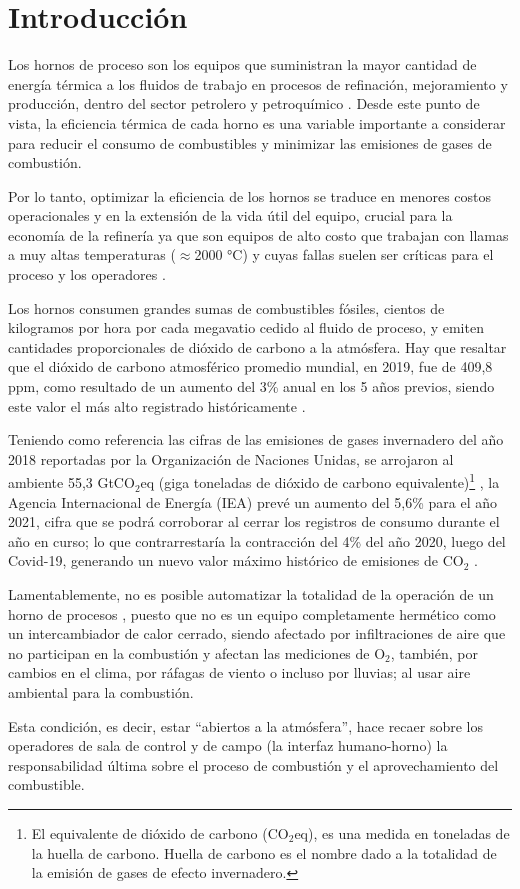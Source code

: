 \chapter*{Introducción}

\par Los hornos de proceso son los equipos que suministran la mayor cantidad de energía térmica a los fluidos de trabajo en procesos de refinación, mejoramiento y producción, dentro del sector petrolero y petroquímico \cite{bib:sandoval}. Desde este punto de vista, la eficiencia térmica de cada horno es una variable importante a considerar para reducir el consumo de combustibles y minimizar las emisiones de gases de combustión.

\par Por lo tanto, optimizar la eficiencia de los hornos se traduce en menores costos operacionales y en la extensión de la vida útil del equipo, crucial para la economía de la refinería ya que son equipos de alto costo que trabajan con llamas a muy altas temperaturas ($\approx$2000 °C) y cuyas fallas suelen ser críticas para el proceso y los operadores \cite{bib:economics}.

\par Los hornos consumen grandes sumas de combustibles fósiles, cientos de kilogramos por hora por cada megavatio cedido al fluido de proceso, y emiten cantidades proporcionales de dióxido de carbono a la atmósfera. Hay que resaltar que el dióxido de carbono atmosférico promedio mundial, en 2019, fue de 409,8 ppm, como resultado de un aumento del 3\% anual en los 5 años previos, siendo este valor el más alto registrado históricamente \cite{bib:clima}.
\par Teniendo como referencia las cifras de las emisiones de gases invernadero del año 2018 reportadas por la Organización de Naciones Unidas, se arrojaron al ambiente 55,3 GtCO$_2$eq (giga toneladas de dióxido de carbono equivalente)\footnote{El equivalente de dióxido de carbono (CO$_2$eq), es una medida en toneladas de la huella de carbono. Huella de carbono es el nombre dado a la totalidad de la emisión de gases de efecto invernadero.} \cite{onu}, la Agencia Internacional de Energía (IEA) prevé un aumento del 5,6\% para el año 2021, cifra que se podrá corroborar al cerrar los registros de consumo durante el año en curso; lo que contrarrestaría la contracción del 4\% del año 2020, luego del Covid-19, generando un nuevo valor máximo histórico de emisiones de CO$_2$ \cite{bib:iea}.

\par Lamentablemente, no es posible automatizar la totalidad de la operación de un horno de procesos \cite{bib:instrumentacion}, puesto que no es un equipo completamente hermético como un intercambiador de calor cerrado, siendo afectado por infiltraciones de aire que no participan en la combustión y afectan las mediciones de O$_2$, también, por cambios en el clima, por ráfagas de viento o incluso por lluvias; al usar aire ambiental para la combustión.
\par Esta condición, es decir, estar ``abiertos a la atmósfera'', hace recaer sobre los operadores de sala de control y de campo (la interfaz humano-horno) la responsabilidad última sobre el proceso de combustión y el aprovechamiento del combustible.

